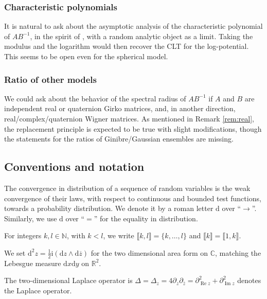 \documentclass[10pt,reqno]{amsart}
\renewcommand{\Re}{\operatorname{Re}}
\renewcommand{\Im}{\operatorname{Im}}
\newcommand{\N}{{\mathbb{N}}}
\newcommand{\C}{{\mathbb{C}}}
\newcommand{\dd}{\mathrm{d}}
\newcommand{\ii}{\mathrm{i}}
\newcommand{\<}{\langle}
\renewcommand{\>}{\rangle}
\numberwithin{equation}{section}
\begin{document}
\subsubsection{Characteristic polynomials}
It is natural to ask about the asymptotic analysis of the characteristic polynomial of $AB^{-1}$, in the spirit of
\cite{MR4408512}, with a random analytic object as a limit. Taking the modulus and the logarithm would then recover the CLT for the log-potential. This seems to be open even for the spherical model.

\subsubsection{Ratio of other models} We could ask about the behavior of the spectral radius of $AB^{-1}$ if $A$ and $B$ are independent real or quaternion Girko matrices, and, in another direction, real/complex/quaternion Wigner matrices. As mentioned in Remark \ref{rem:real}, the replacement principle is expected to be true with slight modifications, though the statements for the ratios of Ginibre/Gaussian ensembles are missing.


\subsection{Conventions and notation}

The convergence in distribution of a sequence of random variables is the weak convergence of their laws, with respect to continuous and bounded test functions, towards a probability distribution. We denote it by a roman letter $\dd$ over ``$\to$''. Similarly, we use $\dd$ over ``$=$'' for the equality in distribution. 

For integers $k,l\in\N$, with $k<l$, we write 
$\llbracket k,l \rrbracket= \{k,\dots, l\}$ and 
$\llbracket k \rrbracket=
\llbracket 1,k \rrbracket$.

We set $\dd^2 z= \frac{1}{2}\ii(\dd z\wedge \dd \overline{z})$ for the two dimensional area form on $\C$, matching the Lebesgue measure $\dd x\dd y$ on $\mathbb{R}^2$.

The two-dimensional Laplace operator is $\Delta=\Delta_z=4\partial_z \partial_{\bar z}=\partial^2_{\Re z}+\partial^2_{\Im z}$ denotes the Laplace operator. 
\end{document}
